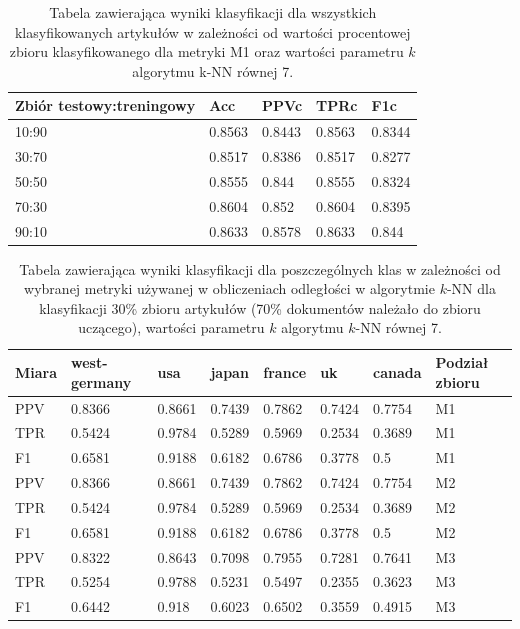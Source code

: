 \documentclass{classrep}
\begin{document}
\begin{table}[H]
    \centering
\caption{Tabela zawierająca wyniki klasyfikacji dla wszystkich klasyfikowanych artykułów w zależności od wartości procentowej zbioru
klasyfikowanego dla metryki M1 oraz wartości parametru $k$ algorytmu k-NN równej 7.}
\begin{adjustbox}{max width=\textwidth}
    \begin{tabular}{|l|l|l|l|l|}
    \hline
        Zbiór testowy:treningowy & Acc & PPVc & TPRc & F1c \\ \hline
        10:90 & 0.8563 & 0.8443 & 0.8563 & 0.8344 \\ \hline
        30:70 & 0.8517 & 0.8386 & 0.8517 & 0.8277 \\ \hline
        50:50 & 0.8555 & 0.844 & 0.8555 & 0.8324 \\ \hline
        70:30 & 0.8604 & 0.852 & 0.8604 & 0.8395 \\ \hline
        90:10 & 0.8633 & 0.8578 & 0.8633 & 0.844 \\ \hline
    \end{tabular}
\end{adjustbox}
\end{table}

\begin{table}[H]
    \centering
\caption{Tabela zawierająca wyniki klasyfikacji dla poszczególnych klas w zależności od wybranej metryki
używanej w obliczeniach odległości w algorytmie $k$-NN dla klasyfikacji 30\% zbioru
artykułów (70\% dokumentów należało do zbioru uczącego), wartości parametru $k$
algorytmu $k$-NN równej 7.}
\begin{adjustbox}{max width=\textwidth}
    \begin{tabular}{|l|l|l|l|l|l|l|l|}
    \hline
        Miara & west-germany  & usa  & japan & france & uk & canada & Podział zbioru \\ \hline
        PPV & 0.8366 & 0.8661 & 0.7439 & 0.7862 & 0.7424 & 0.7754 & M1 \\ \hline
        TPR & 0.5424 & 0.9784 & 0.5289 & 0.5969 & 0.2534 & 0.3689 & M1 \\ \hline
        F1 & 0.6581 & 0.9188 & 0.6182 & 0.6786 & 0.3778 & 0.5 & M1 \\ \hline
        PPV & 0.8366 & 0.8661 & 0.7439 & 0.7862 & 0.7424 & 0.7754 & M2 \\ \hline
        TPR & 0.5424 & 0.9784 & 0.5289 & 0.5969 & 0.2534 & 0.3689 & M2 \\ \hline
        F1 & 0.6581 & 0.9188 & 0.6182 & 0.6786 & 0.3778 & 0.5 & M2 \\ \hline
        PPV & 0.8322 & 0.8643 & 0.7098 & 0.7955 & 0.7281 & 0.7641 & M3 \\ \hline
        TPR & 0.5254 & 0.9788 & 0.5231 & 0.5497 & 0.2355 & 0.3623 & M3 \\ \hline
        F1 & 0.6442 & 0.918 & 0.6023 & 0.6502 & 0.3559 & 0.4915 & M3 \\ \hline
    \end{tabular}
\end{adjustbox}
\end{table}
\end{document}
